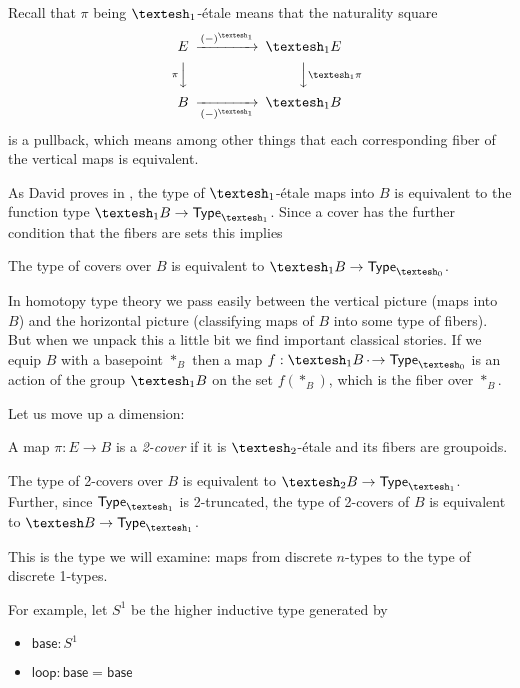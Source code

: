 \documentclass[12pt]{article}
\begin{document}
Recall that \(\pi\) being \(\shapeo\)-étale means that the naturality square 
\[
\begin{CD}
E @>(-)^{\shapeo}>> \shapeo E \\
@V{\pi}VV @VV{\shapeo \pi}V \\
B @>>(-)^{\shapeo}> \shapeo B
\end{CD}
\]
is a pullback, which means among other things that each corresponding fiber of the vertical maps is equivalent.

As David proves in \cite{myersgood}, the type of \(\shapeo\)-étale maps into \(B\) is equivalent to the function type \(\shapeo B \to \Typeo\). Since a cover has the further condition that the fibers are sets this implies

\begin{mylemma}
  The type of covers over \(B\) is equivalent to \(\shapeo B \to \Type_{\shapez}\).
\end{mylemma}

In homotopy type theory we pass easily between the vertical picture (maps into \(B\)) and the horizontal picture (classifying maps of \(B\) into some type of fibers). But when we unpack this a little bit we find important classical stories. If we equip \(B\) with a basepoint \(*_B\) then a map \(f:\shapeo B \dotto \Type_{\shapez}\) is an action of the group \(\shapeo B\) on the set \(f(*_B)\), which is the fiber over \(*_B\).

Let us move up a dimension:

\begin{mydef}
  A map \(\pi:E\to B\) is a \emph{2-cover} if it is \(\shapet\)-étale and its fibers are groupoids.
\end{mydef}

\begin{mylemma}
  The type of 2-covers over \(B\) is equivalent to \(\shapet B \to \Typeo\). Further, since \(\Typeo\) is 2-truncated, the type of 2-covers of \(B\) is equivalent to \(\shape B\to \Typeo\).
\end{mylemma}

This is the type we will examine: maps from discrete \( n \)-types to the type of discrete 1-types.

For example, let \(S^1\) be the higher inductive type generated by
\begin{itemize}
\item \( \mathsf{base}:S^1 \)
\item \( \mathsf{loop}:\mathsf{base}=\mathsf{base} \)
\end{itemize}
\end{document}
